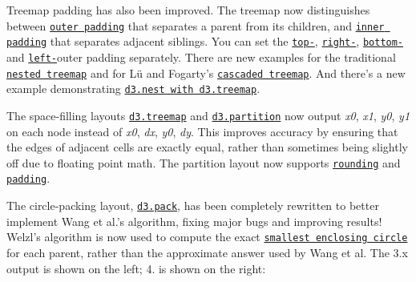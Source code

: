 Treemap padding has also been improved. The treemap now distinguishes between \href{https://github.com/d3/d3-hierarchy/blob/master/README.md#treemap_paddingOuter}{\tt outer padding} that separates a parent from its children, and \href{https://github.com/d3/d3-hierarchy/blob/master/README.md#treemap_paddingInner}{\tt inner padding} that separates adjacent siblings. You can set the \href{https://github.com/d3/d3-hierarchy/blob/master/README.md#treemap_paddingTop}{\tt top-\/}, \href{https://github.com/d3/d3-hierarchy/blob/master/README.md#treemap_paddingRight}{\tt right-\/}, \href{https://github.com/d3/d3-hierarchy/blob/master/README.md#treemap_paddingBottom}{\tt bottom-\/} and \href{https://github.com/d3/d3-hierarchy/blob/master/README.md#treemap_paddingLeft}{\tt left-\/}outer padding separately. There are new examples for the traditional \href{https://bl.ocks.org/mbostock/911ad09bdead40ec0061}{\tt nested treemap} and for Lü and Fogarty’s \href{https://bl.ocks.org/mbostock/f85ffb3a5ac518598043}{\tt cascaded treemap}. And there’s a new example demonstrating \href{https://bl.ocks.org/mbostock/2838bf53e0e65f369f476afd653663a2}{\tt d3.\+nest with d3.\+treemap}.

The space-\/filling layouts \href{https://github.com/d3/d3-hierarchy/blob/master/README.md#treemap}{\tt d3.\+treemap} and \href{https://github.com/d3/d3-hierarchy/blob/master/README.md#partition}{\tt d3.\+partition} now output {\itshape x0}, {\itshape x1}, {\itshape y0}, {\itshape y1} on each node instead of {\itshape x0}, {\itshape dx}, {\itshape y0}, {\itshape dy}. This improves accuracy by ensuring that the edges of adjacent cells are exactly equal, rather than sometimes being slightly off due to floating point math. The partition layout now supports \href{https://github.com/d3/d3-hierarchy/blob/master/README.md#partition_round}{\tt rounding} and \href{https://github.com/d3/d3-hierarchy/blob/master/README.md#partition_padding}{\tt padding}.

The circle-\/packing layout, \href{https://github.com/d3/d3-hierarchy/blob/master/README.md#pack}{\tt d3.\+pack}, has been completely rewritten to better implement Wang et al.\+’s algorithm, fixing major bugs and improving results! Welzl’s algorithm is now used to compute the exact \href{https://bl.ocks.org/mbostock/29c534ff0b270054a01c}{\tt smallest enclosing circle} for each parent, rather than the approximate answer used by Wang et al. The 3.\+x output is shown on the left; 4. is shown on the right\+:

 

